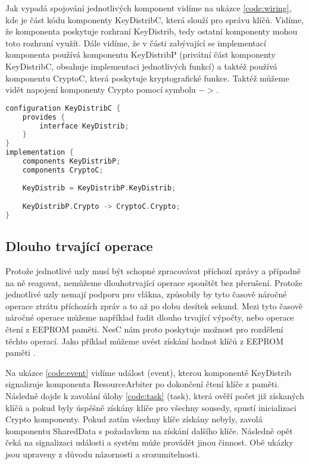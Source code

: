 \documentclass[11pt,final,twoside]{fithesis2}
\begin{document}
Jak vypadá spojování jednotlivých komponent vidíme na ukázce \ref{code:wiring}, kde je část kódu komponenty KeyDistribC, která slouží pro správu klíčů. Vidíme, že komponenta poskytuje rozhraní 
KeyDistrib, tedy ostatní komponenty mohou toto rozhraní využít. Dále vidíme, že v části zabývající se implementací komponenta používá komponentu KeyDistribP (privátní část komponenty KeyDistribC, obsahuje 
implementaci jednotlivých funkcí) a taktéž používá komponentu CryptoC, která poskytuje kryptografické funkce. Taktéž můžeme vidět napojení komponenty Crypto pomocí symbolu $->$.

\begin{lstlisting}[float, language=C,caption=Ukázka propojení komponent,label=code:wiring]
configuration KeyDistribC {
	provides {
		interface KeyDistrib;
	}
}
implementation {
	components KeyDistribP;  
	components CryptoC;
		
	KeyDistrib = KeyDistribP.KeyDistrib;

	KeyDistribP.Crypto -> CryptoC.Crypto;	
}
\end{lstlisting}



\subsection{Dlouho trvající operace} \label{sub:long}
Protože jednotlivé uzly musí být schopné zpracovávat příchozí zprávy a případně na ně reagovat, nemůžeme dlouhotrvající operace spouštět bez přerušení. Protože jednotlivé uzly nemají podporu pro vlákna, 
způsobily by tyto časově náročné operace ztrátu příchozích zpráv a to až po dobu desítek sekund. Mezi tyto časově náročné operace můžeme například řadit dlouho trvající výpočty, nebo operace čtení z EEPROM 
paměti. NesC nám proto poskytuje možnost pro rozdělení těchto operací. Jako příklad můžeme uvést získání hodnot klíčů z EEPROM paměti \cite{Levis2009}.

Na ukázce \ref{code:event} vidíme událost (event), kterou 
komponentě KeyDistrib signalizuje komponenta ResourceArbiter po dokončení čtení klíče z paměti. Následně dojde k zavolání úlohy \ref{code:task} (task), která ověří počet již získaných klíčů a pokud byly 
úspěšně získány klíče pro všechny sousedy, spustí inicializaci Crypto komponenty. Pokud zatím všechny klíče získány nebyly, zavolá komponentu SharedData s požadavkem na získání dalšího klíče. Následně opět 
čeká na signalizaci události a systém může provádět jinou činnost. Obě ukázky jsou upraveny z důvodu názornosti a srozumitelnosti.
\end{document}
